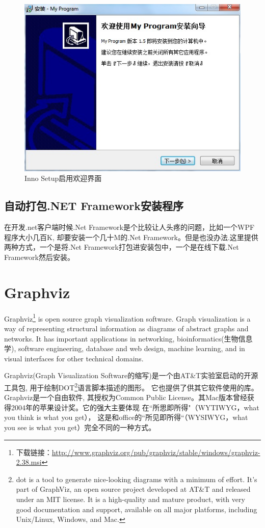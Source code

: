 \documentclass{book}
\begin{document}
\begin{figure}[htbp]
	\centering
	\includegraphics[scale=0.8]{InnoSetupEnableWelcomePage.jpg}
	\caption{Inno Setup启用欢迎界面}
	\label{fig:InnoSetupEnableWelcomePage}
\end{figure}



\subsection{自动打包.NET Framework安装程序}

在开发.net客户端时候.Net Framework是个比较让人头疼的问题，比如一个WPF程序大小几百K,
却要安装一个几十M的.Net Framework。但是也没办法.这里提供两种方式，一个是将.Net Framework打包进安装包中，一个是在线下载.Net Framework然后安装。

\section{Graphviz}

Graphviz\footnote{下载链接：\url{http://www.graphviz.org/pub/graphviz/stable/windows/graphviz-2.38.msi}} is open source graph visualization software. 
Graph visualization is a way of representing structural 
information as diagrams of abstract graphs and networks. 
It has important applications in networking, bioinformatics(生物信息学),
software engineering, database and web design, 
machine learning, and in visual interfaces for other technical domains.

Graphviz(Graph Visualization Software的缩写)是一个由AT\&T实验室启动的开源工具包,
用于绘制DOT\footnote{dot is a tool to generate nice-looking diagrams 
with a minimum of effort. It's part of GraphViz, 
an open source project developed at AT\&T and 
released under an MIT license. It is a high-quality 
and mature product, with very good documentation and 
support, available on all major platforms, 
including Unix/Linux, Windows, and Mac.}语言脚本描述的图形。
它也提供了供其它软件使用的库。Graphviz是一个自由软件,
其授权为Common Public License。其Mac版本曾经获得2004年的苹果设计奖。它的强大主要体现
在“所思即所得"（WYTIWYG，what you think is what you get），
这是和office的“所见即所得“（WYSIWYG，what you see is what you get）完全不同的一种方式。
\end{document}

